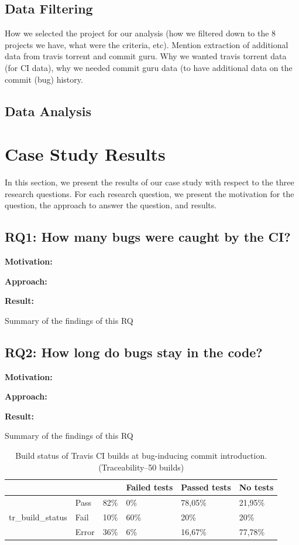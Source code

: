 \documentclass[10pt,conference]{IEEEtran}
\newcommand{\conclusion}[1]{\begin{center}\begin{tcolorbox}[skin=widget, left=0.5mm,right=0.5mm,top=0.5mm,bottom=0.5mm,boxrule=0.3mm,arc=0mm,coltitle=black,colframe=black!99!white,colback=white!88!gray,width=(\linewidth),before=\hfill,after=\hfill]#1\end{tcolorbox}\end{center}}
\newcommand{\rqi}{RQ1:  How many bugs were caught by the CI?}
\newcommand{\rqii}{RQ2: How long do bugs stay in the code?}
\begin{document}
\subsection{Data Filtering}
How we selected the project for our analysis (how we filtered down to the 8 projects we have, what were the criteria, etc). Mention extraction of additional data from travis torrent and commit guru. Why we wanted travis torrent data (for CI data), why we needed commit guru data (to have additional data on the commit (bug) history.

\subsection{Data Analysis}

\section{Case Study Results}
In this section, we present the results of our case study with respect to the three research questions. For each research question, we present the motivation for the question, the approach to answer the question, and results.

\subsection*{\rqi}

\noindent\textbf{Motivation:}

\noindent\textbf{Approach:}

\noindent\textbf{Result:}

\conclusion{Summary of the findings of this RQ}

\subsection*{\rqii}

\noindent\textbf{Motivation:}


\noindent\textbf{Approach:}


\noindent\textbf{Result:}

\conclusion{Summary of the findings of this RQ}

\begin{table}[t]
\centering
\begin{tabular}{lll|lll}
\hline
\multicolumn{3}{l|}{}                                      & Failed tests & Passed tests & No tests \\ \hline
\multirow{3}{*}{tr\_build\_status} & Pass  & 82\% & 0\%          & 78,05\%      & 21,95\%  \\
                                            & Fail  & 10\% & 60\%         & 20\%         & 20\%     \\
                                            & Error & 36\% & 6\%          & 16,67\%      & 77,78\%  \\ \hline
\end{tabular}
\label{tab:bugintro}
\caption{Build status of Travis CI builds at bug-inducing commit introduction. \\ (Traceability--50 builds)}
\end{table}
\end{document}
